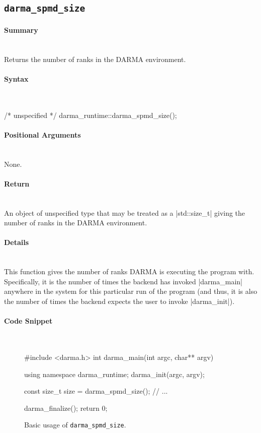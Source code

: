 \subsection{\texttt{darma\_spmd\_size}}


\paragraph{Summary}\mbox{}\\
Returns the number of ranks in the DARMA environment.

\paragraph{Syntax}\mbox{}\\
\begin{CppCode}
/* unspecified */ darma_runtime::darma_spmd_size();
\end{CppCode}

\paragraph{Positional Arguments} \mbox{}\\
None. 

\paragraph{Return} \mbox{}\\
An object of unspecified type that may be treated as a |std::size_t|
giving the number of ranks in the DARMA environment.

\paragraph{Details} \mbox{}\\
This function gives the number of ranks DARMA is executing the program with. 
Specifically, it is the number of times the backend has invoked
|darma_main| anywhere in the system for this particular run of the
program (and thus, it is also the number of times the backend expects the user
to invoke |darma_init|).

\paragraph{Code Snippet} \mbox{}\\
\begin{figure}[!h]
\begin{CppCodeNumb}
#include <darma.h>
int darma_main(int argc, char** argv)
{
  using namespace darma_runtime;
  darma_init(argc, argv);

  const size_t size = darma_spmd_size();
  // ...

  darma_finalize();
  return 0;
}
\end{CppCodeNumb}
\label{fig:fe_api_ranksize}
\caption{Basic usage of \lstinline|darma_spmd_size|.}
\end{figure}

